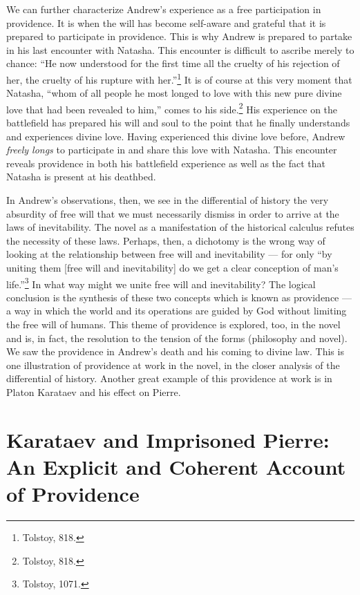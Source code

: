 \documentclass[12pt]{article}
\begin{document}
We can further characterize Andrew's experience as a free participation in providence. It is when the will has become self-aware and grateful that it is prepared to participate in providence. This is why Andrew is prepared to partake in his last encounter with Natasha. This encounter is difficult to ascribe merely to chance: ``He now understood for the first time all the cruelty of his rejection of her, the cruelty of his rupture with her.''\footnote{Tolstoy, 818.} It is of course at this very moment that Natasha, ``whom of all people he most longed to love with this new pure divine love that had been revealed to him,'' comes to his side.\footnote{Tolstoy, 818.} His experience on the battlefield has prepared his will and soul to the point that he finally understands and experiences divine love. Having experienced this divine love before, Andrew \emph{freely longs} to participate in and share this love with Natasha. This encounter reveals providence in both his battlefield experience as well as the fact that Natasha is present at his deathbed.

In Andrew's observations, then, we see in the differential of history the very absurdity of free will that we must necessarily dismiss in order to arrive at the laws of inevitability. The novel as a manifestation of the historical calculus refutes the necessity of these laws. Perhaps, then, a dichotomy is the wrong way of looking at the relationship between free will and inevitability — for only ``by uniting them [free will and inevitability] do we get a clear conception of man's life.''\footnote{Tolstoy, 1071.} In what way might we unite free will and inevitability? The logical conclusion is the synthesis of these two concepts which is known as providence — a way in which the world and its operations are guided by God without limiting the free will of humans. This theme of providence is explored, too, in the novel and is, in fact, the resolution to the tension of the forms (philosophy and novel). We saw the providence in Andrew’s death and his coming to divine law. This is one illustration of providence at work in the novel, in the closer analysis of the differential of history. Another great example of this providence at work is in Platon Karataev and his effect on Pierre.

\section{Karataev and Imprisoned Pierre: An Explicit and Coherent Account of Providence}
\end{document}
